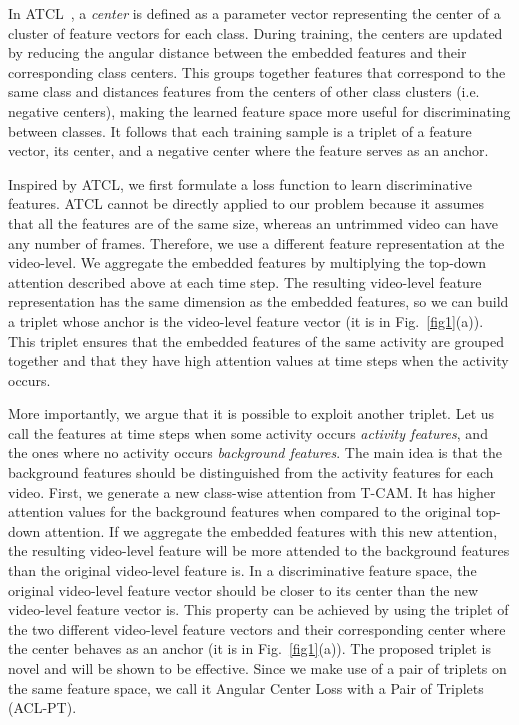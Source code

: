 \documentclass[runningheads]{llncs}
\newcommand{\tcam}{\mbox{T-CAM}}
\newcommand{\intlossnamelong}{Angular Center Loss with a Pair of Triplets}
\newcommand{\intlossname}{\mbox{ACL-PT}}
\newcommand{\atclossname}{\mbox{ATCL}}
\begin{document}
In \atclossname{}~\cite{li2019angular}, a \textit{center} is defined as a parameter vector representing the center of a cluster of feature vectors for each class. During training, the centers are updated by reducing the angular distance between the embedded features and their corresponding class centers. This groups together features that correspond to the same class and distances features from the centers of other class clusters (i.e. negative centers), making the learned feature space more useful for discriminating between classes. It follows that each training sample is a triplet of a feature vector, its center, and a negative center where the feature serves as an anchor.

Inspired by \atclossname{}, we first formulate a loss function to learn discriminative features. \atclossname{} cannot be directly applied to our problem because it assumes that all the features are of the same size, whereas an untrimmed video can have any number of frames. Therefore, we use a different feature representation at the video-level. We aggregate the embedded features by multiplying the top-down attention described above at each time step. The resulting video-level feature representation has the same dimension as the embedded features, so we can build a triplet whose anchor is the video-level feature vector (it is  in Fig.~\ref{fig1}(a)). This triplet ensures that the embedded features of the same activity are grouped together and that they have high attention values at time steps when the activity occurs.

More importantly, we argue that it is possible to exploit another triplet. Let us call the features at time steps when some activity occurs \textit{activity features}, and the ones where no activity occurs \textit{background features}. The main idea is that the background features should be distinguished from the activity features for each video. First, we generate a new class-wise attention from \tcam{}. It has higher attention values for the background features when compared to the original top-down attention. If we aggregate the embedded features with this new attention, the resulting video-level feature will be more attended to the background features than the original video-level feature is. In a discriminative feature space, the original video-level feature vector should be closer to its center than the new video-level feature vector is. This property can be achieved by using the triplet of the two different video-level feature vectors and their corresponding center where the center behaves as an anchor (it is  in Fig.~\ref{fig1}(a)). The proposed triplet is novel and will be shown to be effective. Since we make use of a pair of triplets on the same feature space, we call it \intlossnamelong{} (\intlossname{}).
\end{document}
